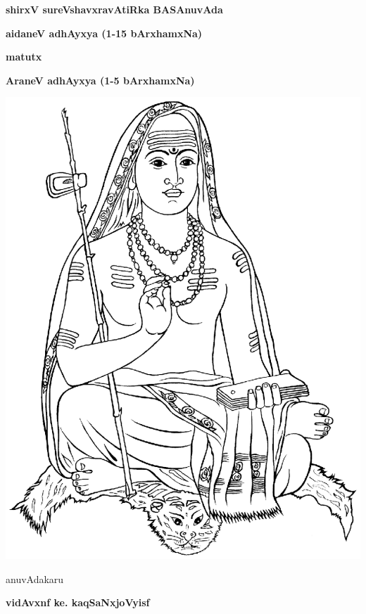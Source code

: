 \thispagestyle{empty}
\begin{center}
{\Huge\bfseries shirxV sureVshavxravAtiRka BASAnuvAda}
\bigskip

{\large\bfseries aidaneV adhAyxya (1-15 bArxhamxNa)}
\smallskip

{\large\bfseries matutx}
\smallskip

{\large\bfseries AraneV adhAyxya (1-5 bArxhamxNa)}
\bigskip

\vfill

\includegraphics[scale=0.7]{figures/shankaracharya.eps}

\vfill

anuvAdakaru
\smallskip

{\large\bfseries vidAvxnf ke. kaqSaNxjoVyisf}


\end{center}

